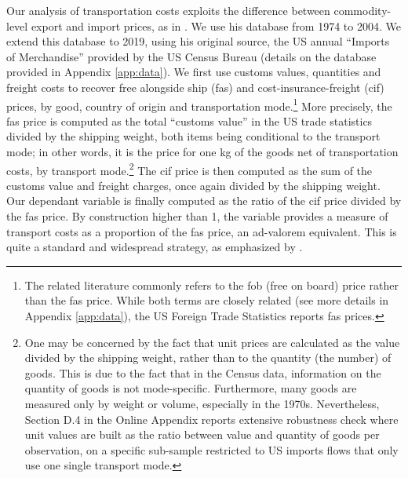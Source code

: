 \documentclass[a4paper,11pt]{article}
\begin{document}
Our analysis of transportation costs exploits the difference between commodity-level export and import prices, as in \cite{hummels2007}. We use his database from 1974 to 2004. We extend this database to 2019, using his original source, the US annual ``Imports of Merchandise'' provided by the US Census Bureau (details on the database provided in Appendix \ref{app:data}). We first use customs values, quantities and freight costs to recover free alongside ship (fas) and cost-insurance-freight (cif) prices, by good, country of origin and transportation mode.\footnote{The related literature commonly refers to the fob (free on board) price rather than the fas price. While both terms are closely related (see more details in Appendix \ref{app:data}), the US Foreign Trade Statistics reports fas prices.} More precisely, the fas price is computed as the total ``customs value'' in the US trade statistics divided by the shipping weight, both items being conditional to the transport mode; in other words, it is the price for one kg of the goods net of transportation costs, by transport mode.\footnote{One may be concerned by the fact that unit prices are calculated as the value divided by the shipping weight, rather than to the quantity (the number) of goods. This is due to the fact that in the Census data, information on the quantity of goods is not mode-specific. Furthermore, many goods are measured only by weight or volume, especially in the 1970s. Nevertheless, Section D.4 in the Online Appendix reports extensive robustness check where unit values are built as the ratio between value and quantity of goods per observation, on a specific sub-sample restricted to US imports flows that only use one single transport mode.}
The cif price is then computed as the sum of the customs value and freight charges, once again divided by the shipping weight. Our dependant variable is finally computed as the ratio of the cif price divided by the fas price. By construction higher than 1, the variable provides a measure of transport costs as a proportion of the fas price, an ad-valorem equivalent. This is quite a standard and widespread strategy, as emphasized by \cite{anderson_wincoop_jel}.
\end{document}
